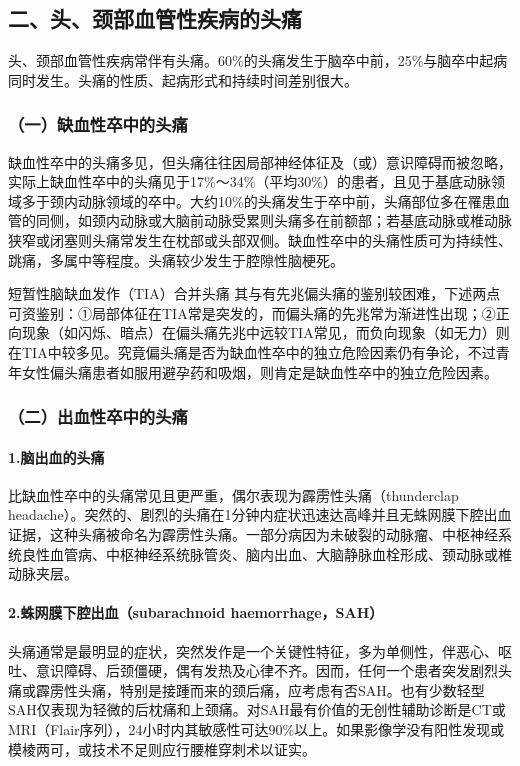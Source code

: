 \subsection{二、头、颈部血管性疾病的头痛}

头、颈部血管性疾病常伴有头痛。60\%的头痛发生于脑卒中前，25\%与脑卒中起病同时发生。头痛的性质、起病形式和持续时间差别很大。

\subsubsection{（一）缺血性卒中的头痛}

缺血性卒中的头痛多见，但头痛往往因局部神经体征及（或）意识障碍而被忽略，实际上缺血性卒中的头痛见于17\%～34\%（平均30\%）的患者，且见于基底动脉领域多于颈内动脉领域的卒中。大约10\%的头痛发生于卒中前，头痛部位多在罹患血管的同侧，如颈内动脉或大脑前动脉受累则头痛多在前额部；若基底动脉或椎动脉狭窄或闭塞则头痛常发生在枕部或头部双侧。缺血性卒中的头痛性质可为持续性、跳痛，多属中等程度。头痛较少发生于腔隙性脑梗死。

短暂性脑缺血发作（TIA）合并头痛
其与有先兆偏头痛的鉴别较困难，下述两点可资鉴别：①局部体征在TIA常是突发的，而偏头痛的先兆常为渐进性出现；②正向现象（如闪烁、暗点）在偏头痛先兆中远较TIA常见，而负向现象（如无力）则在TIA中较多见。究竟偏头痛是否为缺血性卒中的独立危险因素仍有争论，不过青年女性偏头痛患者如服用避孕药和吸烟，则肯定是缺血性卒中的独立危险因素。

\subsubsection{（二）出血性卒中的头痛}

\paragraph{1.脑出血的头痛}

比缺血性卒中的头痛常见且更严重，偶尔表现为霹雳性头痛（thunderclap
headache）。突然的、剧烈的头痛在1分钟内症状迅速达高峰并且无蛛网膜下腔出血证据，这种头痛被命名为霹雳性头痛。一部分病因为未破裂的动脉瘤、中枢神经系统良性血管病、中枢神经系统脉管炎、脑内出血、大脑静脉血栓形成、颈动脉或椎动脉夹层。

\paragraph{2.蛛网膜下腔出血（subarachnoid haemorrhage，SAH）}

头痛通常是最明显的症状，突然发作是一个关键性特征，多为单侧性，伴恶心、呕吐、意识障碍、后颈僵硬，偶有发热及心律不齐。因而，任何一个患者突发剧烈头痛或霹雳性头痛，特别是接踵而来的颈后痛，应考虑有否SAH。也有少数轻型SAH仅表现为轻微的后枕痛和上颈痛。对SAH最有价值的无创性辅助诊断是CT或MRI（Flair序列），24小时内其敏感性可达90\%以上。如果影像学没有阳性发现或模棱两可，或技术不足则应行腰椎穿刺术以证实。

